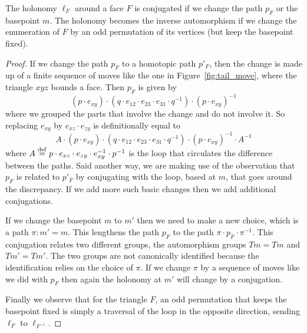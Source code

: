 \begin{myprop}
The holonomy \( \ell_F \) around a face \( F \) is conjugated if we change the path \( p_F \) or the basepoint \( m \). The holonomy becomes the inverse automorphism if we change the enumeration of \( F \) by an odd permutation of its vertices (but keep the basepoint fixed).
\end{myprop}
\begin{proof}
If we change the path \( p_F \) to a homotopic path \( p'_F \), then the change is made up of a finite sequence of moves like the one in Figure~\ref{fig:tail_move}, where the triangle \( xyz \) bounds a face. Then \( p_{F} \) is given by 
\[ (p\cdot e_{xy})\cdot (q\cdot e_{12}\cdot e_{23}\cdot e_{31}\cdot q^{-1})\cdot (p\cdot e_{xy})^{-1}\] 
where we grouped the parts that involve the change and do not involve it. So replacing \( e_{xy} \) by \( e_{xz}\cdot e_{zy} \) is definitionally equal to 
\[ A\cdot (p\cdot e_{xy})\cdot (q\cdot e_{12}\cdot e_{23}\cdot e_{31}\cdot q^{-1})\cdot (p\cdot e_{xy})^{-1}\cdot A^{-1}\] 
where \( A\stackrel{\mathrm{def}}{=} p\cdot e_{xz}\cdot e_{zy}\cdot e_{xy}^{-1}\cdot p^{-1} \) is the loop that circulates the difference between the paths. Said another way, we are making use of the observation that \( p_F \) is related to \( p'_F \) by conjugating with the loop, based at \( m \), that goes around the discrepancy. If we add more such basic changes then we add additional conjugations.

If we change the basepoint \( m \) to \( m' \) then we need to make a new choice, which is a path \( \pi:m'=m \). This lengthens the path \( p_F \) to the path \( \pi\cdot p_F\cdot \pi^{-1} \). This conjugation relates two different groups, the automorphism groups \( Tm=Tm \) and \( Tm'=Tm' \). The two groups are not canonically identified because the identification relies on the choice of \( \pi \). If we change \( \pi \) by a sequence of moves like we did with \( p_F \) then again the holonomy at \( m' \) will change by a conjugation.

Finally we observe that for the triangle \( F \), an odd permutation that keeps the basepoint fixed is simply a traversal of the loop in the opposite direction, sending \( \ell_F \) to \( \ell_{F^{-1}} \).
\end{proof}

